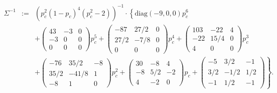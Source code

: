 \documentclass[12pt]{article}
\def\diag{\mbox{diag}}
\begin{document}
\begin{eqnarray*}
\Sigma^{-1}&:=&\left(p_c^2(1-p_c)^4(p_c^2-2)\right)^{-1}\cdot \left\{ \diag(-9,0,0)p_c^6 \right.\\
&& \left. +\left(\begin{array}{ccc} 43 & -3 & 0\\ -3 & 0 & 0 \\ 0 & 0 & 0\end{array}\right)p_c^5
+\left(\begin{array}{ccc} -87 & 27/2 & 0\\ 27/2 & -7/8 & 0 \\ 0 & 0 & 0\end{array}\right)p_c^4
+\left(\begin{array}{ccc} 103 & -22 & 4\\ -22 & 15/4 & 0 \\ 4 & 0 & 0\end{array}\right)p_c^3  \right.\\
&& \left. +\left(\begin{array}{ccc} -76 & 35/2 & -8\\ 35/2 & -41/8 & 1 \\ -8 & 1 & 0\end{array}\right)p_c^2
+\left(\begin{array}{ccc} 30 & -8 & 4\\ -8 & 5/2 & -2 \\ 4 & -2 & 0\end{array}\right)p_c
+\left(\begin{array}{ccc} -5 & 3/2 & -1\\ 3/2 & -1/2 & 1/2 \\ -1 & 1/2 & -1\end{array}\right)\right\} .
\end{eqnarray*}
\end{document}
